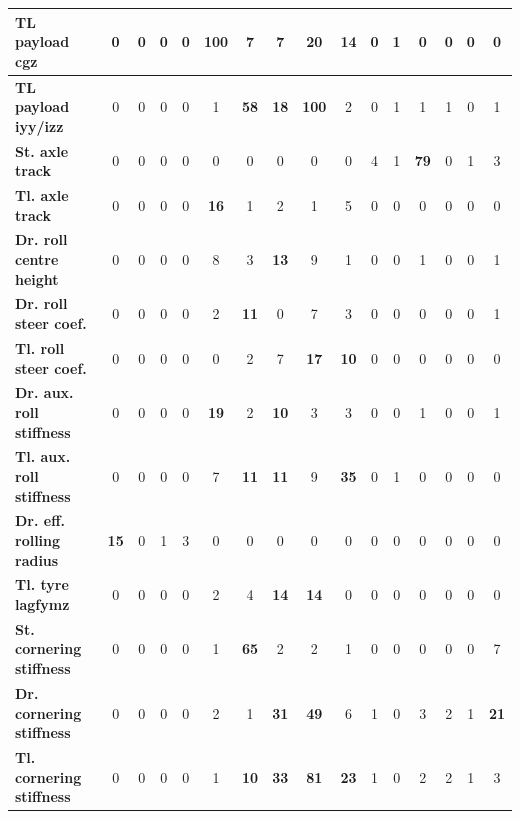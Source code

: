 \begin{table}[H]
\begin{tabular}{|l|c|c|c|c|c|c|c|c|c|c|c|c|c|c|c|}
\hline
\textcolor[rgb]{0.851, 0.373, 0.008}{\textbf{TL payload \gls{cgz}}} & 0 & 0 & 0 & 0 & \textcolor[rgb]{0.835, 0.369, 0.000}{\textbf{100}} & 7 & 7 & \textbf{20} & \textbf{14} & 0 & 1 & 0 & 0 & 0 & 0 \\
\hline
\textcolor[rgb]{0.851, 0.373, 0.008}{\textbf{TL payload \gls{iyy}/\gls{izz}}} & 0 & 0 & 0 & 0 & 1 & \textcolor[rgb]{0.000, 0.447, 0.698}{\textbf{58}} & \textbf{18} & \textcolor[rgb]{0.835, 0.369, 0.000}{\textbf{100}} & 2 & 0 & 1 & 1 & 1 & 0 & 1 \\
\hline
\textcolor[rgb]{0.000, 0.447, 0.698}{\textbf{St. axle track}} & 0 & 0 & 0 & 0 & 0 & 0 & 0 & 0 & 0 & 4 & 1 & \textcolor[rgb]{0.000, 0.447, 0.698}{\textbf{79}} & 0 & 1 & 3 \\
\hline
\textbf{Tl. axle track} & 0 & 0 & 0 & 0 & \textbf{16} & 1 & 2 & 1 & 5 & 0 & 0 & 0 & 0 & 0 & 0 \\
\hline
\textbf{Dr. roll centre height} & 0 & 0 & 0 & 0 & 8 & 3 & \textbf{13} & 9 & 1 & 0 & 0 & 1 & 0 & 0 & 1 \\
\hline
\textbf{Dr. roll steer coef.} & 0 & 0 & 0 & 0 & 2 & \textbf{11} & 0 & 7 & 3 & 0 & 0 & 0 & 0 & 0 & 1 \\
\hline
\textbf{Tl. roll steer coef.} & 0 & 0 & 0 & 0 & 0 & 2 & 7 & \textbf{17} & \textbf{10} & 0 & 0 & 0 & 0 & 0 & 0 \\
\hline
\textbf{Dr. aux. roll stiffness} & 0 & 0 & 0 & 0 & \textbf{19} & 2 & \textbf{10} & 3 & 3 & 0 & 0 & 1 & 0 & 0 & 1 \\
\hline
\textcolor[rgb]{0.000, 0.620, 0.451}{\textbf{Tl. aux. roll stiffness}} & 0 & 0 & 0 & 0 & 7 & \textbf{11} & \textbf{11} & 9 & \textcolor[rgb]{0.000, 0.620, 0.451}{\textbf{35}} & 0 & 1 & 0 & 0 & 0 & 0 \\
\hline
\textbf{Dr. eff. rolling radius} & \textbf{15} & 0 & 1 & 3 & 0 & 0 & 0 & 0 & 0 & 0 & 0 & 0 & 0 & 0 & 0 \\
\hline
\textbf{Tl. tyre \gls{lagfymz}} & 0 & 0 & 0 & 0 & 2 & 4 & \textbf{14} & \textbf{14} & 0 & 0 & 0 & 0 & 0 & 0 & 0 \\
\hline
\textcolor[rgb]{0.000, 0.447, 0.698}{\textbf{St. cornering stiffness}} & 0 & 0 & 0 & 0 & 1 & \textcolor[rgb]{0.000, 0.447, 0.698}{\textbf{65}} & 2 & 2 & 1 & 0 & 0 & 0 & 0 & 0 & 7 \\
\hline
\textcolor[rgb]{0.000, 0.620, 0.451}{\textbf{Dr. cornering stiffness}} & 0 & 0 & 0 & 0 & 2 & 1 & \textcolor[rgb]{0.000, 0.620, 0.451}{\textbf{31}} & \textcolor[rgb]{0.000, 0.620, 0.451}{\textbf{49}} & 6 & 1 & 0 & 3 & 2 & 1 & \textbf{21} \\
\hline
\textcolor[rgb]{0.000, 0.447, 0.698}{\textbf{Tl. cornering stiffness}} & 0 & 0 & 0 & 0 & 1 & \textbf{10} & \textcolor[rgb]{0.000, 0.620, 0.451}{\textbf{33}} & \textcolor[rgb]{0.000, 0.447, 0.698}{\textbf{81}} & \textbf{23} & 1 & 0 & 2 & 2 & 1 & 3 \\
\hline

\end{tabular}%
\end{table}%

